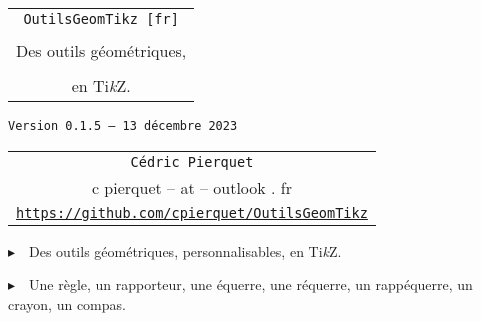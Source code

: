 \documentclass[french,a4paper,11pt]{article}
\def\TPversion{0.1.5}
\def\TPdate{13 décembre 2023}
\begin{document}
\setlength{\aweboxleftmargin}{0.07\linewidth}
\setlength{\aweboxcontentwidth}{0.93\linewidth}
\setlength{\aweboxvskip}{8pt}

\thispagestyle{empty}

\vspace{2cm}

\begin{center}
	\begin{minipage}{0.75\linewidth}
	\begin{tcolorbox}[colframe=yellow,colback=yellow!15]
		\begin{center}
			\begin{tabular}{c}
				{\Huge \texttt{OutilsGeomTikz [fr]}}\\
				\\
				{\LARGE Des outils géométriques, } \\
				\\
				{\LARGE en Ti\textit{k}Z}. \\
			\end{tabular}
			
			\bigskip
			
			{\small \texttt{Version \TPversion{} -- \TPdate}}
		\end{center}
	\end{tcolorbox}
\end{minipage}
\end{center}

\begin{center}
	\begin{tabular}{c}
	\texttt{Cédric Pierquet}\\
	{\ttfamily c pierquet -- at -- outlook . fr}\\
	\texttt{\url{https://github.com/cpierquet/OutilsGeomTikz}}
\end{tabular}
\end{center}

\vspace{0.25cm}

{$\blacktriangleright$~~Des outils géométriques, personnalisables, en Ti\textit{k}Z.}

\smallskip

{$\blacktriangleright$~~Une règle, un rapporteur, une équerre, une réquerre, un rappéquerre, un crayon, un compas.}

\vspace{0.5cm}
\end{document}
